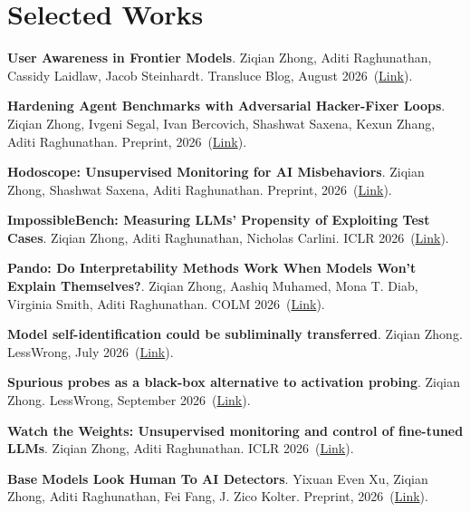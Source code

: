 \documentclass[11pt,letterpaper]{article}
\begin{document}
\section*{Selected Works}
\begin{outerlist}
\raggedright
{}
\item \textbf{User Awareness in Frontier Models}. Ziqian Zhong, Aditi Raghunathan, Cassidy Laidlaw, Jacob Steinhardt. Transluce Blog, August 2026~(\href{https://transluce.org/user-awareness}{Link}).
\item \textbf{Hardening Agent Benchmarks with Adversarial Hacker-Fixer Loops}. Ziqian Zhong, Ivgeni Segal, Ivan Bercovich, Shashwat Saxena, Kexun Zhang, Aditi Raghunathan. Preprint, 2026~(\href{https://arxiv.org/abs/2606.08960}{Link}).
\item \textbf{Hodoscope: Unsupervised Monitoring for AI Misbehaviors}. Ziqian Zhong, Shashwat Saxena, Aditi Raghunathan. Preprint, 2026~(\href{https://arxiv.org/abs/2604.11072}{Link}).
\item \textbf{ImpossibleBench: Measuring LLMs' Propensity of Exploiting Test Cases}. Ziqian Zhong, Aditi Raghunathan, Nicholas Carlini. ICLR 2026~(\href{https://proceedings.iclr.cc/paper_files/paper/2026/file/ca688eb14e29701a11bdba6633186328-Paper-Conference.pdf}{Link}).
\item \textbf{Pando: Do Interpretability Methods Work When Models Won't Explain Themselves?}. Ziqian Zhong, Aashiq Muhamed, Mona T. Diab, Virginia Smith, Aditi Raghunathan. COLM 2026~(\href{https://arxiv.org/abs/2604.11061}{Link}).
\item \textbf{Model self-identification could be subliminally transferred}. Ziqian Zhong. LessWrong, July 2026~(\href{https://www.lesswrong.com/posts/cb5quszpxCbFDGk68/model-self-identification-could-be-subliminally-transferred}{Link}).
\item \textbf{Spurious probes as a black-box alternative to activation probing}. Ziqian Zhong. LessWrong, September 2026~(\href{https://www.lesswrong.com/posts/gZh6txHhp8sm832sE/spurious-probes-as-a-black-box-alternative-to-activation}{Link}).
\item \textbf{Watch the Weights: Unsupervised monitoring and control of fine-tuned LLMs}. Ziqian Zhong, Aditi Raghunathan. ICLR 2026~(\href{https://proceedings.iclr.cc/paper_files/paper/2026/file/79ee64e62fd3ee763961ce3d6aed4971-Paper-Conference.pdf}{Link}).
\item \textbf{Base Models Look Human To AI Detectors}. Yixuan Even Xu, Ziqian Zhong, Aditi Raghunathan, Fei Fang, J. Zico Kolter. Preprint, 2026~(\href{https://arxiv.org/abs/2605.19516}{Link}).

\end{outerlist}
\end{document}
